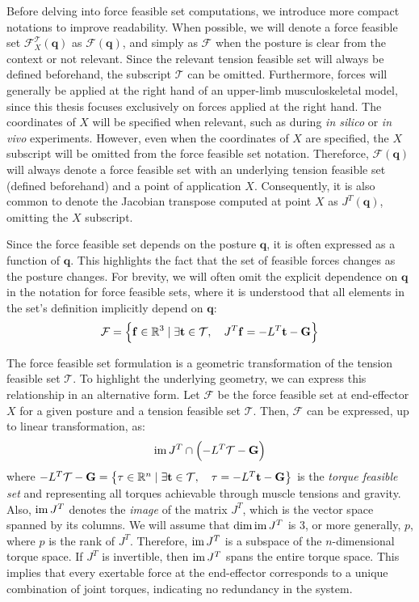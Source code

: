 Before delving into force feasible set computations, we introduce more compact notations to improve readability. When possible, we will denote a force feasible set $\mathcal{F}_X^{\mathcal{T}}(\mathbf{q})$ as $\mathcal{F}(\mathbf{q})$, and simply as $\mathcal{F}$ when the posture is clear from the context or not relevant. Since the relevant tension feasible set will always be defined beforehand, the subscript $\mathcal{T}$ can be omitted. Furthermore, forces will generally be applied at the right hand of an upper-limb musculoskeletal model, since this thesis focuses exclusively on forces applied at the right hand. The coordinates of $X$ will be specified when relevant, such as during \emph{in silico} or \emph{in vivo} experiments. However, even when the coordinates of $X$ are specified, the $X$ subscript will be omitted from the force feasible set notation. Thereforce, $\mathcal{F}(\mathbf{q})$ will always denote a force feasible set with an underlying tension feasible set (defined beforehand) and a point of application $X$. Consequently, it is also common to denote the Jacobian transpose computed at point $X$ as $J^T(\mathbf{q})$, omitting the $X$ subscript.

Since the force feasible set depends on the posture $\mathbf{q}$, it is often expressed as a function of $\mathbf{q}$. This highlights the fact that the set of feasible forces changes as the posture changes. For brevity, we will often omit the explicit dependence on $\mathbf{q}$ in the notation for force feasible sets, where it is understood that all elements in the set's definition implicitly depend on $\mathbf{q}$:
\begin{align*}
    \mathcal{F} = \left\{\mathbf{f}\in\mathbb{R}^3 \mid \exists \mathbf{t}\in \mathcal{T}, \quad J^T\mathbf{f} = -L^T\mathbf{t} - \mathbf{G}\right\}
\end{align*}

The force feasible set formulation is a geometric transformation of the tension feasible set $\mathcal{T}$. To highlight the underlying geometry, we can express this relationship in an alternative form. Let $\mathcal{F}$ be the force feasible set at end-effector $X$ for a given posture and a tension feasible set $\mathcal{T}$. Then, $\mathcal{F}$ can be expressed, up to linear transformation, as:
\begin{align*}
    \operatorname{im}{J^T} \cap \left(-L^T\mathcal{T}-\mathbf{G}\right)
\end{align*}
where $-L^T\mathcal{T}-\mathbf{G} = \left\{\tau\in \mathbb{R}^n\mid \exists \mathbf{t}\in\mathcal{T},\quad \tau = -L^T\mathbf{t} - \mathbf{G} \right\}$ is the \emph{torque feasible set} and representing all torques achievable through muscle tensions and gravity. Also, $\operatorname{im}{J^T}$ denotes the \emph{image} of the matrix $J^T$, which is the vector space spanned by its columns. We will assume that $\dim \operatorname{im}{J^T}$ is $3$, or more generally, $p$, where $p$ is the rank of $J^T$. Therefore, $\operatorname{im}{J^T}$ is a subspace of the $n$-dimensional torque space. If $J^T$ is invertible, then $\operatorname{im}{J^T}$ spans the entire torque space. This implies that every exertable force at the end-effector corresponds to a unique combination of joint torques, indicating no redundancy in the system.

